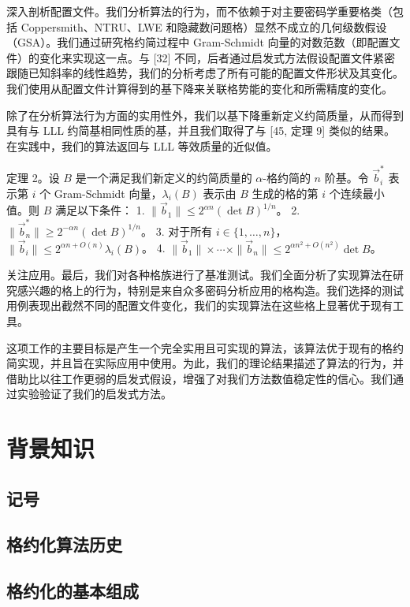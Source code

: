 \documentclass[UTF8]{ctexart}
\begin{document}
    深入剖析配置文件。我们分析算法的行为，而不依赖于对主要密码学重要格类（包括 Coppersmith、NTRU、LWE 和隐藏数问题格）显然不成立的几何级数假设（GSA）。我们通过研究格约简过程中 Gram-Schmidt 向量的对数范数（即配置文件）的变化来实现这一点。与 [32] 不同，后者通过启发式方法假设配置文件紧密跟随已知斜率的线性趋势，我们的分析考虑了所有可能的配置文件形状及其变化。我们使用从配置文件计算得到的基下降来关联格势能的变化和所需精度的变化。

    除了在分析算法行为方面的实用性外，我们以基下降重新定义约简质量，从而得到具有与 LLL 约简基相同性质的基，并且我们取得了与 [45, 定理 9] 类似的结果。在实践中，我们的算法返回与 LLL 等效质量的近似值。

    定理 2。设 \( B \) 是一个满足我们新定义的约简质量的 \( \alpha \)-格约简的 \( n \) 阶基。令 \(\vec{b}_i^*\) 表示第 \( i \) 个 Gram-Schmidt 向量，\(\lambda_i(B)\) 表示由 \( B \) 生成的格的第 \( i \) 个连续最小值。则 \( B \) 满足以下条件：
    1. \(\|\vec{b}_1\| \leq 2^{\alpha n} (\det B)^{1/n}\)。
    2. \(\|\vec{b}_n^*\| \geq 2^{-\alpha n} (\det B)^{1/n}\)。
    3. 对于所有 \( i \in \{1, \dots, n\} \)，\(\|\vec{b}_i\| \leq 2^{\alpha n + O(n)} \lambda_i(B)\)。
    4. \(\|\vec{b}_1\| \times \cdots \times \|\vec{b}_n\| \leq 2^{\alpha n^2 + O(n^2)} \det B\)。

    关注应用。最后，我们对各种格族进行了基准测试。我们全面分析了实现算法在研究感兴趣的格上的行为，特别是来自众多密码分析应用的格构造。我们选择的测试用例表现出截然不同的配置文件变化，我们的实现算法在这些格上显著优于现有工具。

    这项工作的主要目标是产生一个完全实用且可实现的算法，该算法优于现有的格约简实现，并且旨在实际应用中使用。为此，我们的理论结果描述了算法的行为，并借助比以往工作更弱的启发式假设，增强了对我们方法数值稳定性的信心。我们通过实验验证了我们的启发式方法。
\section{背景知识}

    \subsection{记号}

    \subsection{格约化算法历史}

    \subsection{格约化的基本组成}
\end{document}
